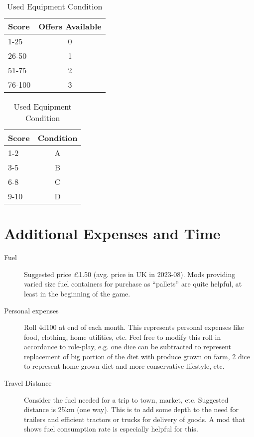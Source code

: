 \documentclass[a4paper,10pt]{article}
\begin{document}
\begin{table}
\begin{minipage}{0.5\textwidth}
\begin{center}
  \caption{Used Equipment Availability}
  \begin{tabular}{lc}
    \toprule
    Score  & Offers Available\\
    \midrule
    1-25   & 0\\
    26-50  & 1\\
    51-75  & 2\\
    76-100 & 3\\
    \bottomrule
  \end{tabular}
  \label{tab:usedEquipmentOffers}
\end{center}
\end{minipage}%
%
\begin{minipage}{0.5\textwidth}
\begin{center}
  \caption{Used Equipment Condition}
  \begin{tabular}{lc}
    \toprule
    Score  & Condition\\
    \midrule
    1-2    & A\\
    3-5    & B\\
    6-8    & C\\
    9-10   & D\\
    \bottomrule
  \end{tabular}
  \label{tab:usedEquipmentOfferRatings}
\end{center}
\end{minipage}
\end{table}


\section{Additional Expenses and Time}
\begin{description}
\item[Fuel] Suggested price \pounds{}1.50 (avg. price in UK in 2023-08). Mods
  providing varied size fuel containers for purchase as ``pallets'' are quite
  helpful, at least in the beginning of the game.
\item[Personal expenses] Roll 4d100 at end of each month. This represents
  personal expenses like food, clothing, home utilities, etc. Feel free to
  modify this roll in accordance to role-play, e.g. one dice can be subtracted
  to represent replacement of big portion of the diet with produce grown on
  farm, 2 dice to represent home grown diet and more conservative lifestyle,
  etc.
\item[Travel Distance] Consider the fuel needed for a trip to town, market, etc.
  Suggested distance is 25km (one way). This is to add some depth to the need
  for trailers and efficient tractors or trucks for delivery of goods. A mod
  that shows fuel consumption rate is especially helpful for this.
\end{description}
\end{document}

